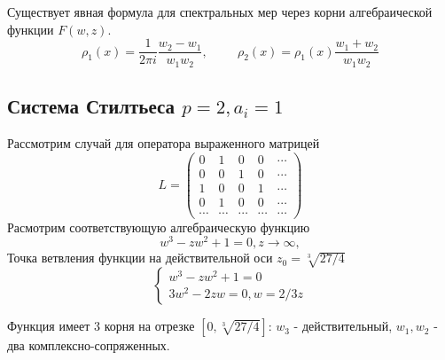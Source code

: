 \documentclass{report}
\begin{document}
Существует явная формула для спектральных мер через корни алгебраической функции $F(w,z)$.
$$
\rho_1(x)=\displaystyle \frac{1}{2\pi i} \frac{w_2-w_1}{w_1w_2}, \hspace {1cm} 
\rho_2(x)= \rho_1(x) \displaystyle \frac{w_1+w_2}{w_1 w_2}
$$ 

\subsection{Система Стилтьеса $p=2, a_i=1$}
Рассмотрим случай для оператора выраженного матрицей
\begin{equation}
L = \left(\begin{array}{ccccccc}
0 & 1 & 0 & 0 & \cdots \\
0 & 0 & 1 & 0 & \cdots \\
1 & 0 & 0 & 1 & \cdots \\
0 & 1 & 0 & 0 & \cdots \\
\cdots & \cdots & \cdots & \cdots & \cdots 
\end{array}\right)
\end{equation}
Расмотрим соответствующую алгебраическую функцию
$$
w^3-zw^2+1=0, z\rightarrow \infty,  
$$
Точка ветвления функции на действительной оси $z_0=\sqrt[3]{27/4}$
\begin{equation}
\left\{
\begin{array}{lllll}
w^3-zw^2+1=0 \\
3w^2-2zw = 0, w=2/3z
\end{array}
\right.
\end{equation}

Функция имеет 3 корня на отрезке $[0, \sqrt[3]{27/4}]$: $w_3$ - действительный, $w_1, w_2$ - два комплексно-сопряженных. \\
\end{document}

